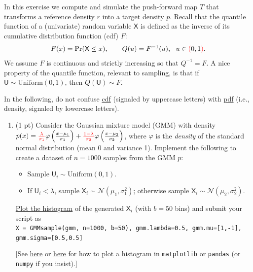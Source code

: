 \documentclass[10pt]{article}
\newcommand{\Usf}{\mathsf{U}}
\newcommand{\Xsf}{\mathsf{X}}
\newcommand{\ie}{{i.e.}\xspace}
\newcommand{\red}[1]{{\color{red}#1}}
\begin{document}
\begin{exercise}
	In this exercise we compute and simulate the push-forward map $T$ that transforms a reference density $r$ into a target density $p$. Recall that the quantile function of a (univariate) random variable $\Xsf$ is defined as the inverse of its cumulative distribution function (cdf) $F$:
	\begin{align}
		F(x) = \Pr(\Xsf \leq x), \qquad
		Q(u) = F^{-1}(u),~~ u \in \red{(}0,1 \red{)}.
	\end{align}
	We assume $F$ is continuous and strictly increasing so that $Q^{-1} = F$. A nice property of the quantile function, relevant to sampling, is that if $\Usf \sim \mathrm{Uniform}(0,1)$, then $Q(\Usf) \sim F$.

	In the following, do not confuse \href{https://en.wikipedia.org/wiki/Cumulative_distribution_function}{cdf} (signaled by uppercase letters) with \href{https://en.wikipedia.org/wiki/Probability_density_function}{pdf} (\ie, density, signaled by lowercase letters).

	\begin{enumerate}
		\item (1 pt) Consider the Gaussian mixture model (GMM) with density $p(x) = \red{\tfrac{\lambda}{\sigma_1}} \varphi\left( \frac{x-\mu_1}{\sigma_1}\right) + \red{\tfrac{1-\lambda}{\sigma_2}} \varphi\left( \frac{x-\mu_2}{\sigma_2}\right)$, where $\varphi$ is the \emph{density} of the standard normal distribution (mean 0 and variance 1). Implement the following to create a dataset of $n=1000$ samples from the GMM $p$:
		      \begin{itemize}
			      \item Sample $\Usf_i\sim \mathrm{Uniform}(0,1)$.
			      \item If $\Usf_i < \lambda$, sample $\Xsf_i \sim \mathcal{N}(\mu_1, \sigma_1^{2})$; otherwise sample $\Xsf_i \sim \mathcal{N}(\mu_2, \sigma_2^{2})$.
		      \end{itemize}
		      \uline{Plot the histogram} of the generated $\Xsf_i$ (with $b=50$ bins) and submit your script as \\ \verb|X = GMMsample(gmm, n=1000, b=50), gmm.lambda=0.5, gmm.mu=[1,-1], gmm.sigma=[0.5,0.5]|

		      [See \href{https://pythonspot.com/matplotlib-histogram/}{here} or \href{https://realpython.com/python-histograms/}{here} for how to plot a histogram in \verb|matplotlib| or \verb|pandas| (or \verb|numpy| if you insist).]


\end{enumerate}
\end{exercise}
\end{document}
